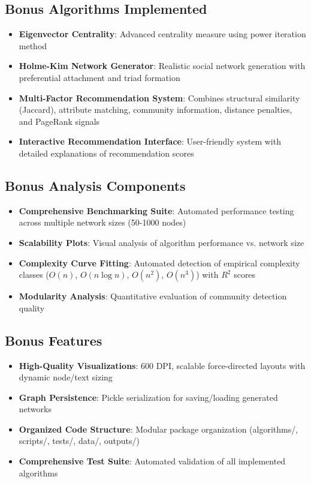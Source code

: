 \documentclass[12pt,a4paper]{article}
\begin{document}
\subsection{Bonus Algorithms Implemented}
\begin{itemize}
    \item \textbf{Eigenvector Centrality}: Advanced centrality measure using power iteration method
    \item \textbf{Holme-Kim Network Generator}: Realistic social network generation with preferential attachment and triad formation
    \item \textbf{Multi-Factor Recommendation System}: Combines structural similarity (Jaccard), attribute matching, community information, distance penalties, and PageRank signals
    \item \textbf{Interactive Recommendation Interface}: User-friendly system with detailed explanations of recommendation scores
\end{itemize}

\subsection{Bonus Analysis Components}
\begin{itemize}
    \item \textbf{Comprehensive Benchmarking Suite}: Automated performance testing across multiple network sizes (50-1000 nodes)
    \item \textbf{Scalability Plots}: Visual analysis of algorithm performance vs. network size
    \item \textbf{Complexity Curve Fitting}: Automated detection of empirical complexity classes ($O(n)$, $O(n \log n)$, $O(n^2)$, $O(n^3)$) with $R^2$ scores
    \item \textbf{Modularity Analysis}: Quantitative evaluation of community detection quality
\end{itemize}

\subsection{Bonus Features}
\begin{itemize}
    \item \textbf{High-Quality Visualizations}: 600 DPI, scalable force-directed layouts with dynamic node/text sizing
    \item \textbf{Graph Persistence}: Pickle serialization for saving/loading generated networks
    \item \textbf{Organized Code Structure}: Modular package organization (algorithms/, scripts/, tests/, data/, outputs/)
    \item \textbf{Comprehensive Test Suite}: Automated validation of all implemented algorithms
\end{itemize}
\end{document}
